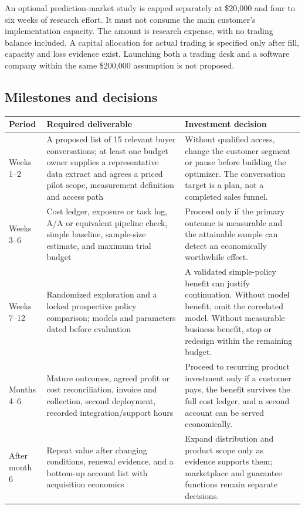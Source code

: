 \documentclass[11pt]{article}
\theoremstyle{remark}\newtheorem{example}{Example}
\begin{document}
An optional prediction-market study is capped separately at \$20,000 and
four to six weeks of research effort. It must not consume the main customer's
implementation capacity. The amount is research expense, with no trading
balance included. A capital allocation for actual trading is specified only
after fill, capacity and loss evidence exist. Launching both a trading desk
and a software company within the same \$200,000 assumption is not proposed.

\subsection{Milestones and decisions}
\begin{longtable}{p{}p{}p{}}
\toprule
Period & Required deliverable & Investment decision \\
\midrule\endhead
Weeks 1--2 & A proposed list of 15 relevant buyer conversations; at least one
budget owner supplies a representative data extract and agrees a priced pilot
scope, measurement definition and access path & Without qualified access,
change the customer segment or pause before building the optimizer. The
conversation target is a plan, not a completed sales funnel. \\
Weeks 3--6 & Cost ledger, exposure or task log, A/A or equivalent pipeline
check, simple baseline, sample-size estimate, and maximum trial budget &
Proceed only if the primary outcome is measurable and the attainable sample
can detect an economically worthwhile effect. \\
Weeks 7--12 & Randomized exploration and a locked prospective policy
comparison; models and parameters dated before evaluation & A validated
simple-policy benefit can justify continuation. Without model benefit, omit
the correlated model. Without measurable business benefit, stop or redesign
within the remaining budget. \\
Months 4--6 & Mature outcomes, agreed profit or cost reconciliation, invoice
and collection, second deployment, recorded integration/support hours &
Proceed to recurring product investment only if a customer pays, the benefit
survives the full cost ledger, and a second account can be served economically. \\
After month 6 & Repeat value after changing conditions, renewal evidence,
and a bottom-up account list with acquisition economics & Expand distribution
and product scope only as evidence supports them; marketplace and guarantee
functions remain separate decisions. \\
\bottomrule
\end{longtable}
\end{document}
